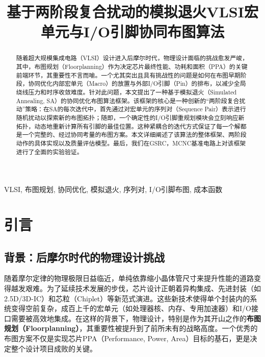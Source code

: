 \documentclass[conference]{IEEEtran}
\begin{document}
\title{基于两阶段复合扰动的模拟退火VLSI宏单元与I/O引脚协同布图算法}

\author{
}

\maketitle

\begin{abstract}
随着超大规模集成电路（VLSI）设计进入后摩尔时代，物理设计面临的挑战愈发严峻，其中，布图规划（Floorplanning）作为决定芯片最终性能、功耗和面积（PPA）的关键前端环节，其重要性不言而喻。一个尤其突出且具有挑战性的问题是如何在布图早期阶段，协同优化内部宏单元（Macro）的放置与外部I/O引脚（Pin）的排布，以减少全局绕线压力和时序收敛难度。针对此问题，本文提出了一种基于模拟退火（Simulated Annealing, SA）的协同优化布图算法框架。该框架的核心是一种创新的“两阶段复合扰动”策略：在SA的每次迭代中，首先通过对宏单元的序列对（Sequence Pair）表示进行随机扰动以探索新的布图拓扑；随即，一个确定性的I/O引脚重规划模块会立刻响应新拓扑，动态地重新计算所有引脚的最佳位置。这种紧耦合的迭代方式保证了每一个解都是一个完整的、经过协同考量的布图方案。本文详细阐述了该算法的整体框架、两阶段动作的具体实现以及质量评估模型。最后，我们在GSRC，MCNC基准电路上对该框架进行了全面的实验验证。
\end{abstract}

\begin{IEEEkeywords}
VLSI, 布图规划, 协同优化, 模拟退火, 序列对, I/O引脚布图, 成本函数
\end{IEEEkeywords}

\section{引言}

\subsection{背景：后摩尔时代的物理设计挑战}
随着摩尔定律的物理极限日益临近，单纯依靠缩小晶体管尺寸来提升性能的道路变得越发艰难。为了延续技术发展的步伐，芯片设计正朝着异构集成、先进封装（如2.5D/3D-IC\cite{N.A.-38}）和芯粒（Chiplet）等新范式演进。这些新技术使得单个封装内的系统变得空前复杂，成百上千的宏单元（如处理器核、内存、专用加速器）和I/O接口需要被高效地集成。在这样的背景下，物理设计，特别是作为其开山之作的\textbf{布图规划（Floorplanning）}，其重要性被提升到了前所未有的战略高度。一个优秀的布图方案不仅是实现芯片PPA（Performance, Power, Area）目标的基石，更是决定整个设计项目成败的关键。
\end{document}
